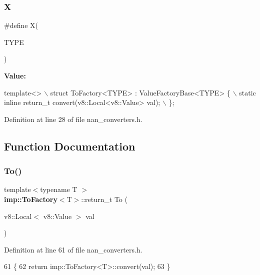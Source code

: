 \subsubsection{X\hspace{0.1cm}{\footnotesize\ttfamily [4/4]}}
{\footnotesize\ttfamily \#define X(\begin{DoxyParamCaption}\item[{}]{T\+Y\+PE }\end{DoxyParamCaption})}

{\bfseries Value\+:}
\begin{DoxyCode}
\textcolor{keyword}{template}<>                                                                 \(\backslash\)
    struct ToFactory<TYPE> : ValueFactoryBase<TYPE> \{                          \(\backslash\)
      static \textcolor{keyword}{inline} return\_t convert(v8::Local<v8::Value> val);                \(\backslash\)
    \};
\end{DoxyCode}


Definition at line 28 of file nan\+\_\+converters.\+h.



\subsection{Function Documentation}
\mbox{\label{nan__converters_8h_a3cbe776970696ef5533fed06a4fe86f4}} 
\subsubsection{To()}
{\footnotesize\ttfamily template$<$typename T $>$ \\
\textbf{ imp\+::\+To\+Factory}$<$T$>$\+::return\+\_\+t To (\begin{DoxyParamCaption}\item[{v8\+::\+Local$<$ v8\+::\+Value $>$}]{val }\end{DoxyParamCaption})}



Definition at line 61 of file nan\+\_\+converters.\+h.


\begin{DoxyCode}
61                                                           \{
62   \textcolor{keywordflow}{return} imp::ToFactory<T>::convert(val);
63 \}
\end{DoxyCode}
